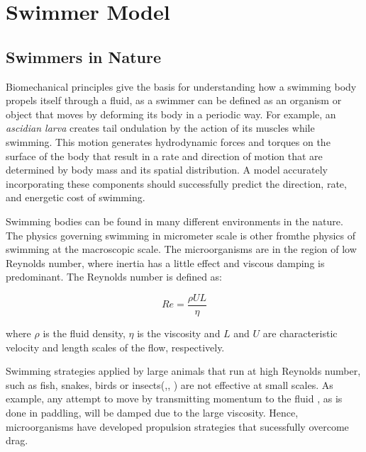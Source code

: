 

\chapter{Swimmer Model}
\label{chap:chapter_2}

\section{Swimmers in Nature}
\label{sec:section_1}


Biomechanical principles give the basis for understanding how a swimming body propels itself through a fluid\cite{mchenry_morphology_2005}, as a swimmer can be defined as
an organism or object that moves by deforming its body in a periodic way. For example, an \textit{ascidian larva} creates
\cite{sawada_biology_2001} tail ondulation by the action of its muscles while swimming. This motion generates hydrodynamic forces and torques on the surface of the body that result in a rate and direction
of motion that are determined by body mass and its spatial distribution. A model accurately incorporating these components should successfully predict the direction, rate, and 
energetic cost of swimming.\par
Swimming bodies can be found in many different environments in the nature. The physics governing swimming in micrometer scale is other fromthe physics of swimming at the macroscopic
scale. The microorganisms are in the region of low Reynolds number, where inertia has a little effect and viscous damping is predominant. The Reynolds number is defined as:

\begin{equation} 
  Re = \frac {\rho UL}{\eta}
\end{equation}

where $\rho$ is the fluid density, $\eta$ is the viscosity and $L$ and $U$ are characteristic velocity and length scales of the flow, respectively.\par

Swimming strategies applied by large animals that run at high Reynolds number, such as fish, snakes, birds or insects(\cite{childress_mechanics_1981},\cite{vogel_life_1996},
\cite{digest_natures}) are not effective at small scales. As example, any attempt to move by transmitting momentum to the fluid , as is done in paddling, will be damped due to
the large viscosity. Hence, microorganisms have developed propulsion strategies that sucessfully overcome drag.



